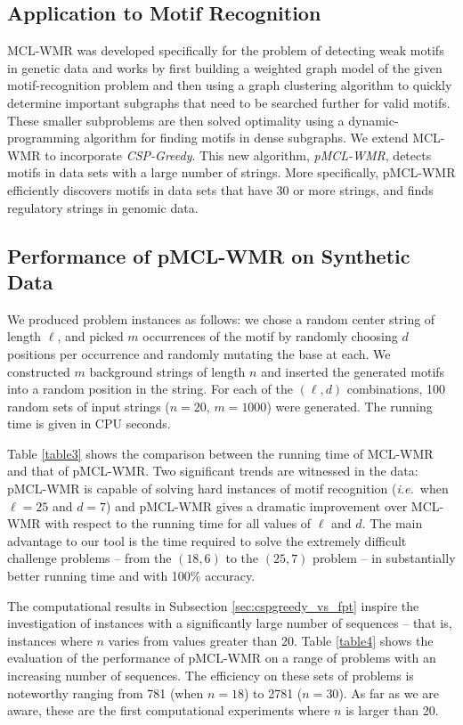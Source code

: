 \subsection{Application to Motif Recognition} 

MCL-WMR was developed specifically for the problem of detecting weak motifs in genetic data and works by first building a weighted graph model of the given motif-recognition problem and then using a graph clustering algorithm to quickly determine important subgraphs that need to be searched further for valid motifs. These smaller subproblems are then solved optimality using a dynamic-programming algorithm for finding motifs in dense subgraphs.  We extend MCL-WMR to incorporate {\em CSP-Greedy}. This new algorithm, {\em pMCL-WMR}, detects motifs in data sets with a large number of strings.  More specifically, pMCL-WMR efficiently discovers motifs in data sets that have 30 or more strings, and finds regulatory strings in genomic data.  

\subsection{Performance of pMCL-WMR on Synthetic Data}

We produced problem instances as follows: we chose a random center string of length $\ell$, and picked $m$ occurrences of the motif by randomly choosing $d$ positions per occurrence and randomly mutating the base at each. We constructed $m$ background strings of length $n$ and inserted the generated motifs into a random position in the string.  For each of the $(\ell, d)$ combinations, 100 random sets of input strings ($n = 20$, $m = 1000$) were generated. The running time is given in CPU seconds.  

Table \ref{table3} shows the comparison between the running time of MCL-WMR and that of pMCL-WMR. Two significant trends are witnessed in the data: pMCL-WMR is capable of solving hard instances of motif recognition ({\em i.e.}\ when $\ell = 25$ and $d = 7$) and pMCL-WMR gives a dramatic improvement over MCL-WMR with respect to the running time for all values of $\ell$ and $d$. The main advantage to our tool is the time required to solve the extremely difficult challenge problems -- from the $(18, 6)$ to the $(25, 7)$ problem -- in substantially better running time and with 100\% accuracy. 

The computational results in Subsection \ref{sec:cspgreedy_vs_fpt} inspire the investigation of instances with a significantly large number of sequences -- that is, instances where $n$ varies from values greater than 20. Table \ref{table4} shows the evaluation of the performance of pMCL-WMR on a range of problems with an increasing number of sequences.  The efficiency on these sets of problems is noteworthy ranging from 781 (when $n = 18$) to 2781 ($n = 30$). As far as we are aware, these are the first computational experiments where $n$ is larger than 20. 


